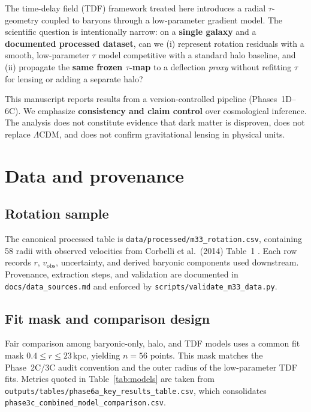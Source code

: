 \documentclass[11pt,a4paper]{article}
\begin{document}
The time-delay field (TDF) framework treated here introduces a radial $\tau$-geometry coupled to baryons through a low-parameter gradient model.
The scientific question is intentionally narrow: on a \textbf{single galaxy} and a \textbf{documented processed dataset}, can we (i) represent rotation residuals with a smooth, low-parameter $\tau$ model competitive with a standard halo baseline, and (ii) propagate the \textbf{same frozen $\tau$-map} to a deflection \emph{proxy} without refitting $\tau$ for lensing or adding a separate halo?

This manuscript reports results from a version-controlled pipeline (Phases~1D--6C).
We emphasize \textbf{consistency and claim control} over cosmological inference.
The analysis does not constitute evidence that dark matter is disproven, does not replace $\Lambda$CDM, and does not confirm gravitational lensing in physical units.

\section{Data and provenance}
\label{sec:data}

\subsection{Rotation sample}

The canonical processed table is \texttt{data/processed/m33\_rotation.csv}, containing 58 radii with observed velocities from Corbelli et al.\ (2014) Table~1 \citep{Corbelli2014}.
Each row records $r$, $v_{\mathrm{obs}}$, uncertainty, and derived baryonic components used downstream.
Provenance, extraction steps, and validation are documented in \texttt{docs/data\_sources.md} and enforced by \texttt{scripts/validate\_m33\_data.py}.

\subsection{Fit mask and comparison design}

Fair comparison among baryonic-only, halo, and TDF models uses a common fit mask $0.4 \le r \le 23$\,kpc, yielding $n{=}56$ points.
This mask matches the Phase~2C/3C audit convention and the outer radius of the low-parameter TDF fits.
Metrics quoted in Table~\ref{tab:models} are taken from \texttt{outputs/tables/phase6a\_key\_results\_table.csv}, which consolidates \texttt{phase3c\_combined\_model\_comparison.csv}.
\end{document}
